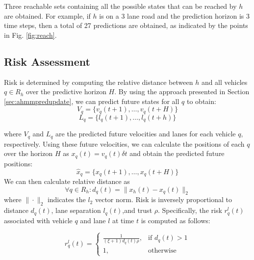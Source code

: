 \documentclass[letterpaper, 10 pt, conference]{ieeeconf}  %
\newcommand\NB[1]{$\spadesuit$\footnote{NB: #1}}
\newcommand\RP[1]{$\clubsuit$\footnote{RP: #1}}
\begin{document}
Three reachable sets containing all the possible states that can be reached by $h$ are obtained. For example, if $h$ is on a 3 lane road and the prediction horizon is 3 time steps, then a total of 27 predictions are obtained, as indicated by the points in Fig. \ref{fig:reach}.


\subsection{Risk Assessment}

Risk is determined by computing the relative distance between $h$ and all vehicles $q\in R_h$ over the predictive horizon $H$. By using the approach presented in Section \ref{sec:ahmmpredupdate}, we can predict future states for all $q$ to obtain:
\begin{equation}
    V_q = \{v_q(t+1),\ldots,v_q(t+H)\}
\end{equation}
\begin{equation}
    L_q = \{l_q(t+1),\ldots,l_q(t+h)\}
\end{equation}

where $V_q$ and $L_q$ are the predicted future velocities and lanes for each vehicle $q$, respectively.
Using these future velocities, we can calculate the positions of each $q$ over the horizon $H$ as $x_q(t) = v_q(t)\delta t$ and obtain the predicted future positions:
\begin{equation}
    \hat{x}_q = \{x_q(t+1),\ldots,x_q(t+H)\}
\end{equation}
We can then calculate relative distance as
\begin{equation}
    \forall q \in R_h: d_q(t) = \lVert x_h(t)-x_q(t)\rVert_2
\end{equation}
where $\rVert \cdot \lVert_2$ indicates the $l_2$ vector norm. Risk is inversely proportional to distance $d_q(t)$, lane separation $l_q(t)$,and trust $\rho$. Specifically, the risk $r_q^l(t)$ associated with vehicle $q$ and lane $l$ at time $t$ is computed as follows: %

\begin{equation} \label{eq:riskcalc}
    r_{q}^{l}(t) =
    \begin{cases}
    \frac{1}{(\xi+1) d_{q}(t)\rho},  & \text{if } d_{q}(t) > 1  \\
        1,                     & \text{otherwise}  
    \end{cases}
\end{equation}
\end{document}
